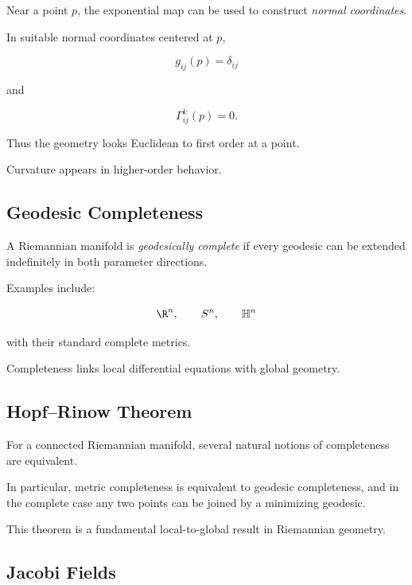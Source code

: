 Near a point \(p\), the exponential map can be used to construct
\emph{normal coordinates}.

In suitable normal coordinates centered at \(p\),

\[
\boxed{
g_{ij}(p)=\delta_{ij}
}
\]

and

\[
\boxed{
\Gamma^k_{ij}(p)=0.
}
\]

Thus the geometry looks Euclidean to first order at a point.

Curvature appears in higher-order behavior.

\subsection{Geodesic Completeness}
\label{subsec:geodesic-completeness}

A Riemannian manifold is \emph{geodesically complete} if every geodesic can
be extended indefinitely in both parameter directions.

Examples include:

\[
\R^n,
\qquad
S^n,
\qquad
\mathbb{H}^n
\]

with their standard complete metrics.

Completeness links local differential equations with global geometry.

\subsection{Hopf--Rinow Theorem}
\label{subsec:hopf-rinow}

\begin{theorem}
For a connected Riemannian manifold, several natural notions of completeness
are equivalent.

In particular, metric completeness is equivalent to geodesic completeness,
and in the complete case any two points can be joined by a minimizing
geodesic.
\end{theorem}

This theorem is a fundamental local-to-global result in Riemannian geometry.

\subsection{Jacobi Fields}
\label{subsec:jacobi-fields}

